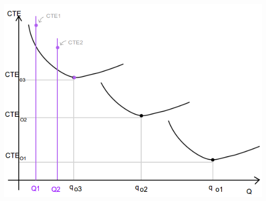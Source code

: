 \documentclass{article}
\begin{document}
\begin{enumerate}
      \includegraphics[scale=0.5,keepaspectratio=true]{img/7/7_QvsCTE_5.png} 
 \end{enumerate}
\end{document}
